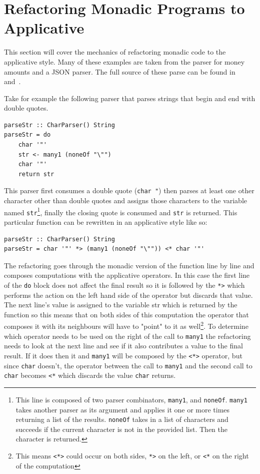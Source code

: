 \section{Refactoring Monadic Programs to Applicative}
\label{sec:appRefact}
This section will cover the mechanics of refactoring monadic code to the applicative style. Many of these examples are taken from the parser for money amounts and a JSON parser. The full source of these parse can be found in~\citep{moneyParse} and~\citep{jsonParser}.

Take for example the following parser that parses strings that begin and end with double quotes.

\begin{lstlisting}[frame=tlrb]
parseStr :: CharParser() String
parseStr = do
	char '"'
	str <- many1 (noneOf "\"")
	char '"'
	return str
\end{lstlisting}

This parser first consumes a double quote (\texttt{char \textquotesingle"\textquotesingle}) then parses at least one other character other than double quotes and assigns those characters to the variable named \texttt{str}\footnote{This line is composed of two parser combinators, \texttt{many1}, and \texttt{noneOf}. \texttt{many1} takes another parser as its argument and applies it one or more times returning a list of the results. \texttt{noneOf} takes in a list of characters and succeeds if the current character is not in the provided list. Then the character is returned.}, finally the closing quote is consumed and \texttt{str} is returned. This particular function can be rewritten in an applicative style like so:

\begin{lstlisting}[frame=tlrb]
parseStr :: CharParser() String
parseStr = char '"' *> (many1 (noneOf "\"")) <* char '"'
\end{lstlisting}

The refactoring goes through the monadic version of the function line by line and composes computations with the applicative operators. In this case the first line of the \texttt{do} block does not affect the final result so it is followed by the \texttt{*>} which performs the action on the left hand side of the operator but discards that value. The next line's value is assigned to the variable str which is returned by the function so this means that on both sides of this computation the operator that composes it with its neighbours will have to "point" to it as well\footnote{This means \texttt{<*>} could occur on both sides, \texttt{*>} on the left, or \texttt{<*} on the right of the computation}. To determine which operator needs to be used on the right of the call to \texttt{many1} the refactoring needs to look at the next line and see if it also contributes a value to the final result. If it does then it and \texttt{many1} will be composed by the \texttt{<*>} operator, but since \texttt{char} doesn't, the operator between the call to \texttt{many1} and the second call to \texttt{char} becomes \texttt{<*} which discards the value \texttt{char} returns.

